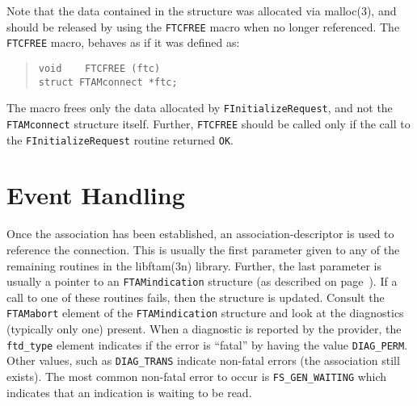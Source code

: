 Note that the data contained in the structure was allocated via \man malloc(3),
and should be released by using the \verb"FTCFREE" macro when no longer
referenced.
The \verb"FTCFREE" macro,
behaves as if it was defined as:
\begin{quote}\small\begin{verbatim}
void    FTCFREE (ftc)
struct FTAMconnect *ftc;
\end{verbatim}\end{quote}
The macro frees only the data allocated by \verb"FInitializeRequest",
and not the \verb"FTAMconnect" structure itself.
Further,
\verb"FTCFREE" should be called only if the call to the
\verb"FInitializeRequest" routine returned \verb"OK".

\section	{Event Handling}
Once the association has been established,
an association-descriptor is used to reference the connection.
This is usually the first parameter given to any of the remaining routines in
the \man libftam(3n) library.
Further,
the last parameter is usually a pointer to an \verb"FTAMindication" structure
(as described on page~\pageref{FTAMindication}).
If a call to one of these routines fails,
then the structure is updated.
Consult the \verb"FTAMabort" element of the \verb"FTAMindication" structure
and look at the diagnostics (typically only one) present.
When a diagnostic is reported by the provider,
the \verb"ftd_type" element indicates if the error is ``fatal'' by having the
value \verb"DIAG_PERM".
Other values, such as \verb"DIAG_TRANS" indicate non-fatal errors
(the association still exists).
The most common non-fatal error to occur is \verb"FS_GEN_WAITING" which
indicates that an indication is waiting to be read.

